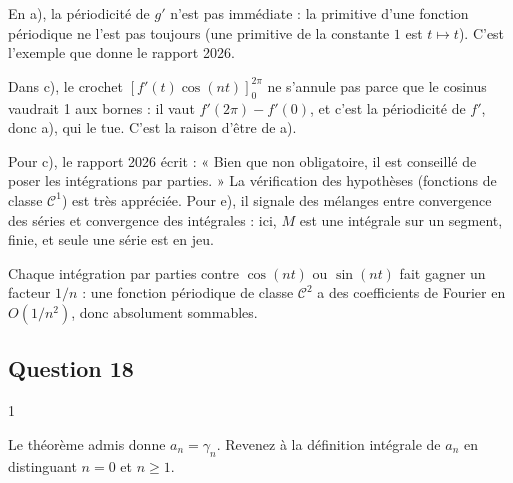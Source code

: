 \documentclass[11pt,a4paper]{article}
\begin{document}
\begin{piege}

En a), la périodicité de \(g'\) n'est pas immédiate : la primitive d'une fonction périodique ne l'est pas toujours (une primitive de la constante \(1\) est \(t\mapsto t\)). C'est l'exemple que donne le rapport 2026.

\end{piege}

\begin{piege}

Dans c), le crochet \([f'(t)\cos(nt)]_0^{2\pi}\) ne s'annule pas parce que le cosinus vaudrait 1 aux bornes : il vaut \(f'(2\pi)-f'(0)\), et c'est la périodicité de \(f'\), donc a), qui le tue. C'est la raison d'être de a).

\end{piege}

\begin{jury}

Pour c), le rapport 2026 écrit : « Bien que non obligatoire, il est conseillé de poser les intégrations par parties. » La vérification des hypothèses (fonctions de classe \(\mathcal C^1\)) est très appréciée. Pour e), il signale des mélanges entre convergence des séries et convergence des intégrales : ici, \(M\) est une intégrale sur un segment, finie, et seule une série est en jeu.

\end{jury}

\begin{methode}

Chaque intégration par parties contre \(\cos(nt)\) ou \(\sin(nt)\) fait gagner un facteur \(1/n\) : une fonction périodique de classe \(\mathcal C^2\) a des coefficients de Fourier en \(O(1/n^2)\), donc absolument sommables.

\end{methode}

\hypertarget{question-18}{%
\subsection{Question 18}\label{question-18}}

\begin{indication}{1}

Le théorème admis donne \(a_n=\gamma_n\). Revenez à la définition intégrale de \(a_n\) en distinguant \(n=0\) et \(n\ge1\).

\end{indication}
\end{document}

